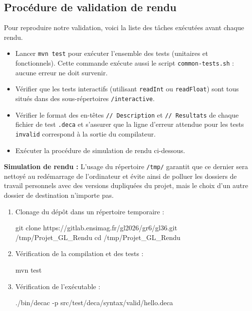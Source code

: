\subsection{Procédure de validation de rendu}\label{subsec:proc-validation-rendu}
\noindent
Pour reproduire notre validation, voici la liste des tâches exécutées avant chaque rendu.

\begin{itemize}
        \item[$\square$] Lancer \texttt{mvn test} pour exécuter l'ensemble des tests (unitaires et fonctionnels). Cette commande exécute aussi le script \texttt{common-tests.sh} : aucune erreur ne doit survenir.
        \item[$\square$] Vérifier que les tests interactifs (utilisant \texttt{readInt} ou \texttt{readFloat}) sont tous situés dans des sous-répertoires \texttt{/interactive}.
        \item[$\square$] Vérifier le format des en-têtes \texttt{// Description} et \texttt{// Resultats} de chaque fichier de test \texttt{.deca} et s'assurer que la ligne d'erreur attendue pour les tests \texttt{invalid} correspond à la sortie du compilateur.
        \item[$\square$] Exécuter la procédure de simulation de rendu ci-dessous.
\end{itemize}  

\noindent \textbf{Simulation de rendu :}
L'usage du répertoire \texttt{/tmp/} garantit que ce dernier sera nettoyé au redémarrage de l'ordinateur et évite ainsi de polluer les dossiers de travail personnels avec des versions dupliquées du projet, mais le choix d'un autre dossier de destination n'importe pas.

\begin{enumerate}
    \item 
    Clonage du dépôt dans un répertoire temporaire :
    \begin{command}
git clone https://gitlab.ensimag.fr/gl2026/gr6/gl36.git /tmp/Projet_GL_Rendu
cd /tmp/Projet_GL_Rendu
    \end{command}

    \item Vérification de la compilation et des tests : 
    \begin{command}
mvn test
    \end{command}

    \item Vérification de l'exécutable : 
    \begin{command}
./bin/decac -p src/test/deca/syntax/valid/hello.deca
    \end{command}
\end{enumerate}


